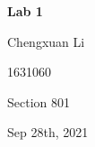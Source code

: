 \documentclass{article}
\begin{document}
\begin{titlepage}
\begin{center}
\vspace*{1cm}
		
\textbf{Lab 1}
			
\vspace{0.5cm}
Chengxuan Li
			
\vspace{0.1cm}
1631060
			
\vspace{0.1cm}
Section 801
			
\vspace{0.1cm}
Sep 28th, 2021
\end{center}
\end{titlepage}

\begin{lstlisting}[language=Matlab]
%
\end{lstlisting}
\end{document}
